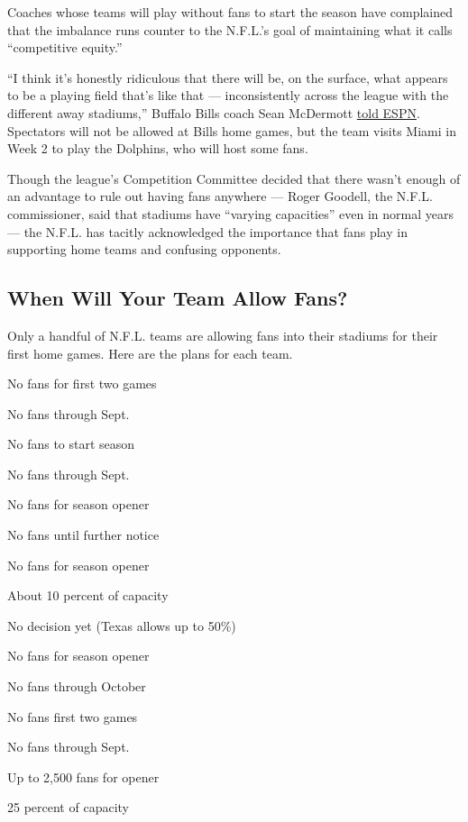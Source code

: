 Coaches whose teams will play without fans to start the season have
complained that the imbalance runs counter to the N.F.L.'s goal of
maintaining what it calls ``competitive equity.''

``I think it's honestly ridiculous that there will be, on the surface,
what appears to be a playing field that's like that --- inconsistently
across the league with the different away stadiums,'' Buffalo Bills
coach Sean McDermott
\href{https://twitter.com/Marcel_LJ/status/1297894552364363777}{told
ESPN}. Spectators will not be allowed at Bills home games, but the team
visits Miami in Week 2 to play the Dolphins, who will host some fans.

Though the league's Competition Committee decided that there wasn't
enough of an advantage to rule out having fans anywhere --- Roger
Goodell, the N.F.L. commissioner, said that stadiums have ``varying
capacities'' even in normal years --- the N.F.L. has tacitly
acknowledged the importance that fans play in supporting home teams and
confusing opponents.

\hypertarget{when-will-your-team-allow-fans}{%
\subsection{When Will Your Team Allow
Fans?}\label{when-will-your-team-allow-fans}}

Only a handful of N.F.L. teams are allowing fans into their stadiums for
their first home games. Here are the plans for each team.

No fans for first two games

No fans through Sept.

No fans to start season

No fans through Sept.

No fans for season opener

No fans until further notice

No fans for season opener

About 10 percent of capacity

No decision yet (Texas allows up to 50\%)

No fans for season opener

No fans through October

No fans first two games

No fans through Sept.

Up to 2,500 fans for opener

25 percent of capacity

